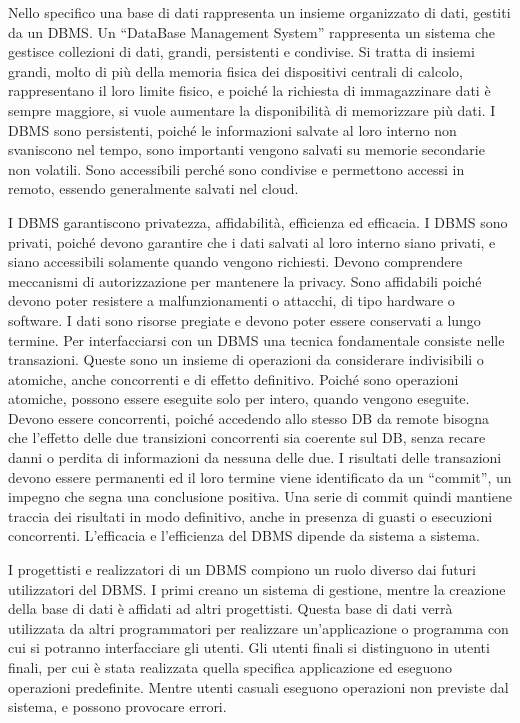 \documentclass{article}
\numberwithin{equation}{subsection}
\begin{document}
Nello specifico una base di dati rappresenta un insieme organizzato di dati, gestiti da un DBMS. 
Un ``DataBase Management System'' rappresenta un sistema che gestisce collezioni di dati, grandi, persistenti e condivise. 
Si tratta di insiemi grandi, molto di più della memoria fisica dei dispositivi centrali di calcolo, rappresentano il loro limite fisico, e poiché la richiesta di immagazzinare dati 
è sempre maggiore, si vuole aumentare la disponibilità di memorizzare più dati. 
I DBMS sono persistenti, poiché le informazioni salvate al loro interno non svaniscono nel tempo, sono importanti vengono salvati su memorie secondarie non volatili. 
Sono accessibili perché sono condivise e permettono accessi in remoto, essendo generalmente salvati nel cloud. 

I DBMS garantiscono privatezza, affidabilità, efficienza ed efficacia. I DBMS sono privati, poiché devono garantire che i dati salvati al loro interno siano privati, 
e siano accessibili solamente quando vengono richiesti. Devono comprendere meccanismi di autorizzazione per mantenere la privacy. 
Sono affidabili poiché devono poter resistere a malfunzionamenti o attacchi, di tipo hardware o software. I dati sono risorse pregiate e devono poter essere conservati 
a lungo termine. 
Per interfacciarsi con un DBMS una tecnica fondamentale consiste nelle transazioni. Queste sono un insieme di operazioni da considerare indivisibili o atomiche, anche 
concorrenti e di effetto definitivo. Poiché sono operazioni atomiche, possono essere eseguite solo per intero, quando vengono eseguite. Devono essere concorrenti, poiché 
accedendo allo stesso DB da remote bisogna che l'effetto delle due transizioni concorrenti sia coerente sul DB, senza recare danni o perdita di informazioni da nessuna delle 
due. 
I risultati delle transazioni devono essere permanenti ed il loro termine viene identificato da un ``commit'', un impegno che segna una conclusione positiva. Una serie 
di commit quindi mantiene traccia dei risultati in modo definitivo, anche in presenza di guasti o esecuzioni concorrenti. 
L'efficacia e l'efficienza del DBMS dipende da sistema a sistema. 

I progettisti e realizzatori di un DBMS compiono un ruolo diverso dai futuri utilizzatori del DBMS. I primi creano un sistema di gestione, mentre la creazione della base 
di dati è affidati ad altri progettisti. Questa base di dati verrà utilizzata da altri programmatori per realizzare un'applicazione o programma con cui si potranno 
interfacciare gli utenti. Gli utenti finali si distinguono in utenti finali, per cui è stata realizzata quella specifica applicazione ed eseguono operazioni 
predefinite. Mentre utenti casuali eseguono operazioni non previste dal sistema, e possono provocare errori. 
\end{document}
